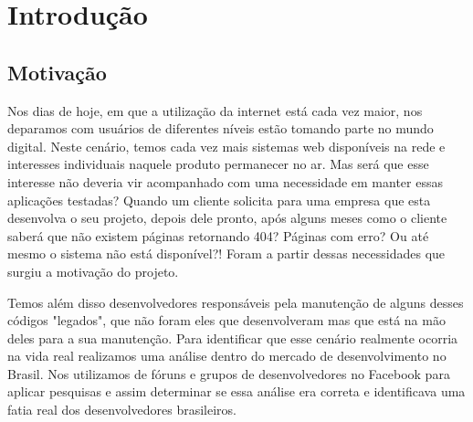 \chapter{Introdução}\label{chp:LABEL_CHP_1}

\section{Motivação}\label{sec:LABEL_CHP_1_SEC_A}

Nos dias de hoje, em que a utilização da internet está cada vez maior, nos deparamos com usuários de diferentes níveis estão tomando parte no mundo digital. Neste cenário, temos cada vez mais sistemas web disponíveis na rede e interesses individuais naquele produto permanecer no ar. Mas será que esse interesse não deveria vir acompanhado com uma necessidade em manter essas aplicações testadas? Quando um cliente solicita para uma empresa que esta desenvolva o seu projeto, depois dele pronto, após alguns meses como o cliente saberá que não existem páginas retornando 404? Páginas com erro? Ou até mesmo o sistema não está disponível?! Foram a partir dessas necessidades que surgiu a motivação do projeto. 

Temos além disso desenvolvedores responsáveis pela manutenção de alguns desses códigos "legados", que não foram eles que desenvolveram mas que está na mão deles para a sua manutenção. Para identificar que esse cenário realmente ocorria na vida real realizamos uma análise dentro do mercado de desenvolvimento no Brasil. Nos utilizamos de fóruns e grupos de desenvolvedores no Facebook para aplicar pesquisas e assim determinar se essa análise era correta e identificava uma fatia real dos desenvolvedores brasileiros.

